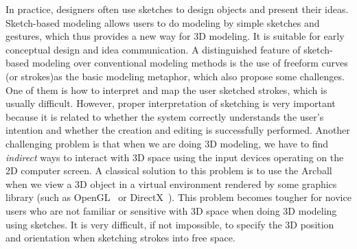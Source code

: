 In practice, designers often use sketches to design objects and present their ideas. Sketch-based modeling allows users to do modeling by simple sketches and gestures, which thus provides a new way for 3D modeling. It is suitable for early conceptual design and idea communication. A distinguished feature of sketch-based modeling over conventional modeling methods is the use of freeform curves (or strokes)as the basic modeling metaphor, which also propose some challenges. One of them is how to interpret and map the user sketched strokes, which is usually difficult. However, proper interpretation of sketching is very important because it is related to whether the system correctly understands the user's intention and whether the creation and editing is successfully performed. Another challenging problem is that when we are doing 3D modeling, we have to find \textit{indirect} ways to interact with 3D space using the input devices operating on the 2D computer screen. A classical solution to this problem is to use the Arcball~\cite{SK07} when we view a 3D object in a virtual environment rendered by some graphics library (such as OpenGL~\cite{SR06} or DirectX~\cite{BD06}). This problem becomes tougher for novice users who are not familiar or sensitive with 3D space when doing 3D modeling using sketches. It is very difficult, if not impossible, to specify the 3D position and orientation when sketching strokes into free space.

